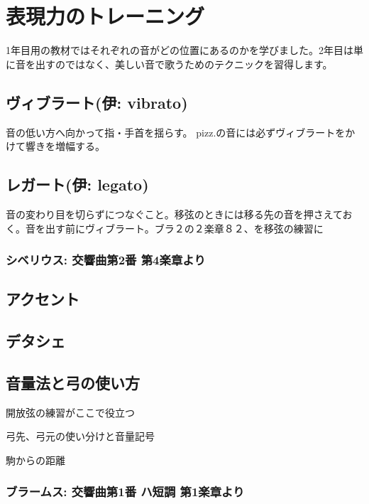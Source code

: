 \section{表現力のトレーニング}
1年目用の教材ではそれぞれの音がどの位置にあるのかを学びました。2年目は単に音を出すのではなく、美しい音で歌うためのテクニックを習得します。

\subsection{ヴィブラート(伊: vibrato)}
音の低い方へ向かって指・手首を揺らす。
pizz.の音には必ずヴィブラートをかけて響きを増幅する。



\subsection{レガート(伊: legato)}
音の変わり目を切らずにつなぐこと。移弦のときには移る先の音を押さえておく。音を出す前にヴィブラート。ブラ２の２楽章８２、を移弦の練習に

\subsubsection*{シベリウス: 交響曲第2番 第4楽章より}






\subsection{アクセント}



\subsection{デタシェ}




\subsection{音量法と弓の使い方}
開放弦の練習がここで役立つ

弓先、弓元の使い分けと音量記号

駒からの距離




\subsubsection*{ブラームス: 交響曲第1番 ハ短調 第1楽章より}


